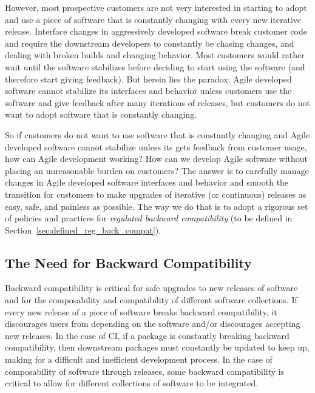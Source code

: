 \documentclass[11pt]{SANDreport}
\begin{document}
However, most prospective customers are not very interested in
starting to adopt and use a piece of software that is constantly
changing with every new iterative release.  Interface changes in
aggressively developed software break customer code and require the
downstream developers to constantly be chasing changes, and dealing
with broken builds and changing behavior.  Most customers would rather
wait until the software stabilizes before deciding to
start using the software (and therefore start giving feedback).  But
herein lies the paradox: Agile developed software cannot stabilize
its interfaces and behavior unless customers use the software and give
feedback after many iterations of releases, but customers do not want
to adopt software that is constantly changing.

So if customers do not want to use software that is constantly
changing and Agile developed software cannot stabilize unless its gets
feedback from customer usage, how can Agile development working?  How
can we develop Agile software without placing an unreasonable
burden on customers?  The answer is to carefully manage changes in
Agile developed software interfaces and behavior and smooth the
transition for customers to make upgrades of iterative (or continuous)
releases as easy, safe, and painless as possible.  The way we do that
is to adopt a rigorous set of policies and practices for
{}\textit{regulated backward compatibility} (to be defined in
Section~\ref{sec:defined_reg_back_compat}).


%
{}\subsection{The Need for Backward Compatibility}
\label{sec:need_for_back_compat}
%

Backward compatibility is critical for safe upgrades to new releases
of software and for the composability and compatibility of different
software collections.  If every new release of a piece of software
breaks backward compatibility, it discourages users from depending on
the software and/or discourages accepting new releases.  In the case
of CI, if a package is constantly breaking backward compatibility, then
downstream packages must constantly be updated to keep up, making for
a difficult and inefficient development process.  In the case of
composability of software through releases, some backward
compatibility is critical to allow for different collections of
software to be integrated.
\end{document}
